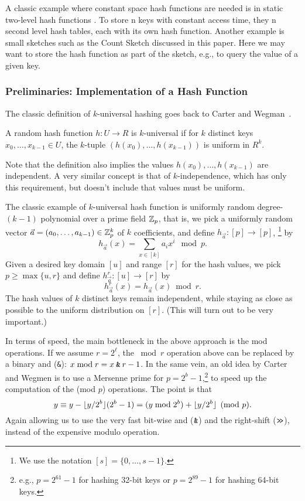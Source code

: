 A classic example where constant space hash functions are needed is in
static two-level hash functions \cite{FKS84}.  To store n keys with
constant access time, they n second level hash tables, each with its
own hash function.  Another example is small sketches such as the
Count Sketch \cite{charikar04count-sketch} discussed in this
paper. Here we may want to store the hash function as part of the
sketch, e.g., to query the value of a given key.


\subsubsection{Preliminaries: Implementation of a Hash Function}
The classic definition of $k$-universal hashing
goes back to Carter and Wegman~\cite{wegman81kwise}.
\begin{definition}
   A random hash function $h:U\to R$ is $k$-universal if for $k$
   distinct keys $x_0,\ldots,x_{k-1}\in U$, the $k$-tuple
   $(h(x_0),\ldots,h(x_{k-1}))$ is uniform in $R^k$.
\end{definition}
\noindent
Note that the definition also implies the values 
$h(x_0),\ldots,h(x_{k-1})$ are independent.
A very similar concept is that of $k$-independence, which has only this requirement, but doesn't include that values must be uniform.

The classic example of $k$-universal
hash function is uniformly random degree-$(k-1)$ polynomial over a prime field
$\mathbb Z_p$, that is, we pick a uniformly random vector
$\vec a=(a_0,\ldots,a_{k-1})\in \mathbb Z_p^k$ of $k$ coefficients, and define
$h_{\vec a}:[p]\to[p]$,
\footnote{ We use the notation $[s]=\{0,\ldots,s-1\}$.  }
   by 
\[h_{\vec a}(x)=\sum_{x\in[k]}a_i x^i \mod p.\]
%
Given a desired key domain $[u]$ and range $[r]$ for the hash values, we pick
$p\geq \max\{u,r\}$ and define
$h^r_{\vec a}:[u]\to[r]$ by
\[h^r_{\vec a}(x)=h_{\vec a}(x)\bmod r.\]
The  hash values of $k$ distinct keys remain independent,
while staying as close as possible to the uniform distribution on $[r]$.
(This will turn out to be very important.)

In terms of speed, the main bottleneck in the above approach is the mod operations.
If we assume $r=2^\ell$, the $\bmod r$ operation above can be replaced by a binary {\sc and} (\texttt{\&}): $x \bmod r = x \mathbin{\texttt{\&}} r-1$.
In the same vein, an old idea by 
Carter and Wegmen \cite{carter77universal} is to use a
Mersenne prime for $p=2^b-1$,\footnote{e.g., $p=2^{61}-1$ for hashing 32-bit keys or
$p=2^{89}-1$ for hashing 64-bit keys.}
to speed up the computation of the (mod $p$) operations.
The point is that
\begin{equation}
   y%
   \equiv y - \floor{y/2^b}(2^b-1)
   = (y\bmod 2^{b}) + \floor{y/2^b}
   \pmod {p}.
   \label{eq:Mersenne}
\end{equation}
Again allowing us to use the very fast bit-wise {\sc and} ($\mathbin{\texttt{\&}}$) and the right-shift ($\mathbin{\texttt{>\!>}}$),
instead of the expensive modulo operation.


